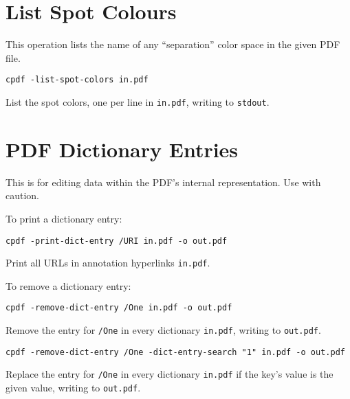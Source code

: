 \documentclass{book}
\begin{document}
\section{List Spot Colours}
This operation lists the name of any ``separation'' color space in the given PDF file.

  \begin{framed}
  \small\noindent\verb!cpdf -list-spot-colors in.pdf!

  \vspace{2.5mm}
  \noindent List the spot colors, one per line in \texttt{in.pdf}, writing to \texttt{stdout}.
  \end{framed}

\section{PDF Dictionary Entries}
\label{removedictentry}
This is for editing data within the PDF's internal representation. Use with caution.


To print a dictionary entry:

  \begin{framed}
  \small\noindent\verb!cpdf -print-dict-entry /URI in.pdf -o out.pdf!

  \vspace{2.5mm}
  \noindent Print all URLs in annotation hyperlinks \texttt{in.pdf}. 
  \end{framed}

To remove a dictionary entry:

  \begin{framed}
  \small\noindent\verb!cpdf -remove-dict-entry /One in.pdf -o out.pdf!

  \vspace{2.5mm}
  \noindent Remove the entry for \texttt{/One} in every dictionary \texttt{in.pdf}, writing to \texttt{out.pdf}. 

  \vspace{2.5mm}

  \small\noindent\verb!cpdf -remove-dict-entry /One -dict-entry-search "1" in.pdf -o out.pdf!

  \vspace{2.5mm}
  \noindent Replace the entry for \texttt{/One} in every dictionary \texttt{in.pdf} if the key's value is the given value, writing to \texttt{out.pdf}. 
  \end{framed}
\end{document}
